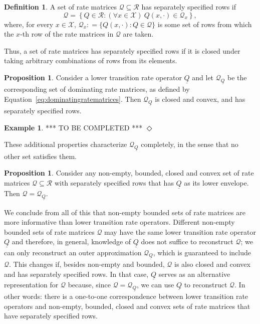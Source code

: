 \documentclass[10pt]{paper}
\theoremstyle{definition}
\newtheorem{exmp}{Example}%
\newtheorem{proposition}[theorem]{Proposition}
\newtheorem{definition}{Definition}
\newcommand{\states}{\mathcal{X}}
\newcommand{\rateset}{\mathcal{Q}}
\newcommand{\lrate}{\underline{Q}}
\newcommand{\coloneqq}{:\!=}
\newcommand{\exampleend}{\hfill$\Diamond$}
\begin{document}
\begin{definition}
A set of rate matrices $\rateset\subseteq\mathcal{R}$ has separately specified rows if
\begin{equation*}
\rateset=\left\{
Q\in\mathcal{R}
\colon
(\forall x\in\states)~Q(x,\cdot)\in\rateset_x\right\},
\end{equation*}
where, for every $x\in\states$, $\rateset_x\coloneqq\{Q(x,\cdot)\colon Q\in\rateset\}$ is some set of rows from which the $x$-th row of the rate matrices in $\rateset$ are taken.
\end{definition}
\noindent Thus, a set of rate matrices has separately specified rows if it is closed under taking arbitrary combinations of rows from its elements. 

\begin{proposition}\label{prop:dominatingproperties}
Consider a lower transition rate operator $\lrate$ and let $\rateset_{\lrate}$ be the corresponding set of dominating rate matrices, as defined by Equation~\eqref{eq:dominatingratematrices}. Then $\rateset_{\lrate}$ is closed and convex, and has separately specified rows.
\end{proposition}

\begin{exmp}
*** TO BE COMPLETED ***
\exampleend
\end{exmp}

\noindent
These additional properties characterize $\rateset_{\lrate}$ completely, in the sense that no other set satisfies them.

\begin{proposition}\label{prop:dominating_unique_characterization}
Consider any non-empty, bounded, closed and convex set of rate matrices $\rateset\subseteq\mathcal{R}$ with separately specified rows that has $\lrate$ as its lower envelope. Then $\rateset=\rateset_{\lrate}$.
\end{proposition}

We conclude from all of this that non-empty bounded sets of rate matrices are more informative than lower transition rate operators. Different non-empty bounded sets of rate matrices $\rateset$ may have the same lower transition rate operator $\lrate$ and therefore, in general, knowledge of $\lrate$ does not suffice to reconstruct $\rateset$; we can only reconstruct an outer approximation $\rateset_{\lrate}$, which is guaranteed to include $\rateset$. This changes if, besides non-empty and bounded, $\rateset$ is also closed and convex and has separately specified rows. In that case, $\lrate$ serves as an alternative representation for $\rateset$ because, since $\rateset=\rateset_{\lrate}$, we can use $\lrate$ to reconstruct $\rateset$. In other words: there is a one-to-one correspondence between lower transition rate operators and non-empty, bounded, closed and convex sets of rate matrices that have separately specified rows.
\end{document}

